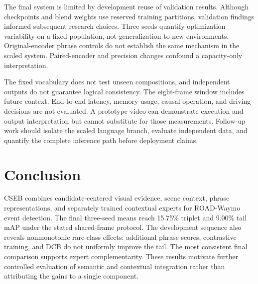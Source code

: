 \documentclass[11pt,letterpaper]{article}
\begin{document}
The final system is limited by development reuse of validation results. Although checkpoints and blend weights use reserved training partitions, validation findings informed subsequent research choices. Three seeds quantify optimization variability on a fixed population, not generalization to new environments. Original-encoder phrase controls do not establish the same mechanism in the scaled system. Paired-encoder and precision changes confound a capacity-only interpretation.

The fixed vocabulary does not test unseen compositions, and independent outputs do not guarantee logical consistency. The eight-frame window includes future context. End-to-end latency, memory usage, causal operation, and driving decisions are not evaluated. A prototype video can demonstrate execution and output interpretation but cannot substitute for those measurements. Follow-up work should isolate the scaled language branch, evaluate independent data, and quantify the complete inference path before deployment claims.

\section{Conclusion}
CSEB combines candidate-centered visual evidence, scene context, phrase representations, and separately trained contextual experts for ROAD-Waymo event detection. The final three-seed means reach 15.75\% triplet and 9.00\% tail mAP under the stated shared-frame protocol. The development sequence also reveals nonmonotonic rare-class effects: additional phrase scores, contrastive training, and DCB do not uniformly improve the tail. The most consistent final comparison supports expert complementarity. These results motivate further controlled evaluation of semantic and contextual integration rather than attributing the gains to a single component.
\printbibliography
\end{document}
